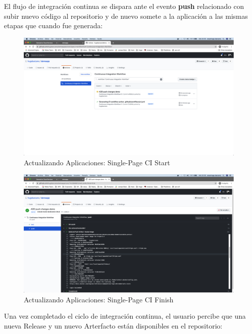 \documentclass[a4paper,11pt]{book}
\begin{document}
 
 El flujo de integración continua se dispara ante el evento \textbf{push} relacionado con subir nuevo código al repositorio y de nuevo somete a la aplicación a las mismas etapas que cuando fue generada:
 
  \begin{figure}[H]
\centering
\includegraphics[scale=0.2]{imagenes/casouso/2_6.png}
\caption{  Actualizando Aplicaciones: Single-Page CI Start }
\end{figure}

  \begin{figure}[H]
\centering
\includegraphics[scale=0.2]{imagenes/casouso/2_7.png}
\caption{ Actualizando Aplicaciones: Single-Page CI Finish  }
\end{figure}

 Una vez completado el ciclo de integración continua, el usuario percibe que una nueva Release y un nuevo Arterfacto están disponibles en el repositorio:
 
\end{document}
